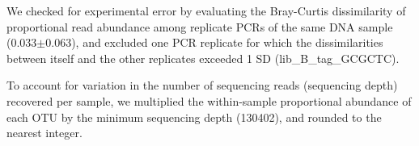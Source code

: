 \documentclass[11pt,letterpaper]{article} %
\begin{document}
We checked for experimental error by evaluating the Bray-Curtis dissimilarity of proportional read abundance among replicate PCRs of the same DNA sample (0.033$\pm$0.063), and excluded one PCR replicate for which the dissimilarities between itself and the other replicates exceeded 1 SD (lib\_B\_tag\_GCGCTC).

%
%
%
%
%
%
%


To account for variation in the number of sequencing reads (sequencing depth) recovered per sample, we multiplied the within-sample proportional abundance of each OTU by the minimum sequencing depth (130402), and rounded to the nearest integer.
\end{document}
